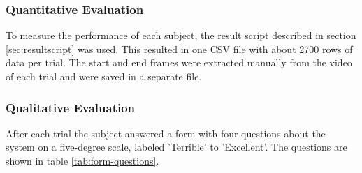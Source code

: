 \documentclass[nofilelist]{cslthse-msc}
\begin{document}
\subsubsection{Quantitative Evaluation}
To measure the performance of each subject, the result script described in section \ref{sec:resultscript} was used. This resulted in one CSV file with about 2700 rows of data per trial. The start and end frames were extracted manually from the video of each trial and were saved in a separate file.  

\subsubsection{Qualitative Evaluation}
After each trial the subject answered a form with four questions about the system on a five-degree scale, labeled 'Terrible' to 'Excellent'. The questions are shown in table \ref{tab:form-questions}.

\setlength{\extrarowheight}{5pt}
\vspace{10pt}
\end{document}
